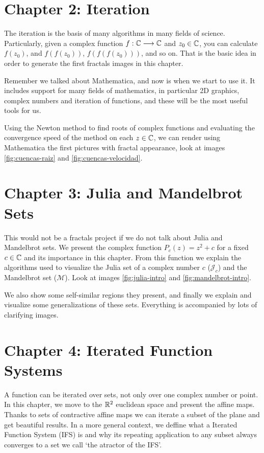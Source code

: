\section*{Chapter 2: Iteration}

The iteration is the basis of many algorithms in many fields of science. Particularly, given a complex function $f:\mathbb{C}\longrightarrow\mathbb{C}$ and $z_0\in\mathbb{C}$, you can calculate $f(z_0)$, and $f(f(z_0))$, $f(f(f(z_0)))$, and so on. That is the basic idea in order to generate the first fractals images in this chapter.

Remember we talked about Mathematica, and now is when we start to use it. It includes support for many fields of mathematics, in particular 2D graphics, complex numbers and iteration of functions, and these will be the most useful tools for us. 

Using the Newton method to find roots of complex functions and evaluating the convergence speed of the method on each $z\in\mathbb{C}$, we can render using Mathematica the first pictures with fractal appearance, look at images \ref{fig:cuencas-raiz} and \ref{fig:cuencas-velocidad}.

\section*{Chapter 3: Julia and Mandelbrot Sets}

This would not be a fractals project if we do not talk about Julia and Mandelbrot sets. We present the complex function $P_c(z)=z^2 +c$ for a fixed $c\in\mathbb{C}$ and its importance in this chapter. From this function we explain the algorithms used to visualize the Julia set of a complex number $c$ ($\mathcal{J}_c$) and the Mandelbrot set ($\mathcal{M}$). Look at images \ref{fig:julia-intro} and \ref{fig:mandelbrot-intro}. 

We also show some self-similar regions they present, and finally we explain and visualize some generalizations of these sets. Everything is accompanied by lots of clarifying images.

\section*{Chapter 4: Iterated Function Systems}

A function can be iterated over sets, not only over one complex number or point. In this chapter, we move to the $\mathbb{R}^2$ euclidean space and present the affine maps. Thanks to sets of contractive affine maps we can iterate a subset of the plane and get beautiful results. In a more general context, we deffine what a Iterated Function System (IFS) is and why its repeating application to any subset always converges to a set we call `the atractor of the IFS'.

